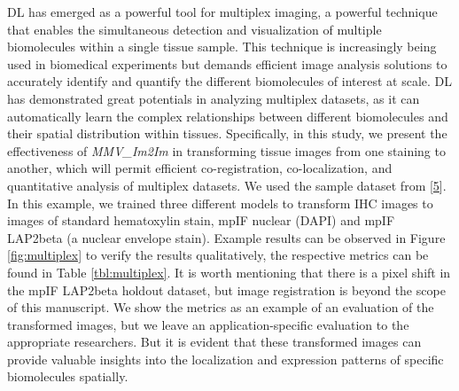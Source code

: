 DL has emerged as a powerful tool for multiplex imaging, a powerful technique that enables the simultaneous detection and visualization of multiple biomolecules within a single tissue sample. This technique is increasingly being used in biomedical experiments but demands efficient image analysis solutions to accurately identify and quantify the different biomolecules of interest at scale. DL has demonstrated great potentials in analyzing multiplex datasets, as it can automatically learn the complex relationships between different biomolecules and their spatial distribution within tissues. Specifically, in this study, we present the effectiveness of \emph{MMV\_Im2Im} in transforming tissue images from one staining to another, which will permit efficient co-registration, co-localization, and quantitative analysis of multiplex datasets. We used the sample dataset from {[}\protect\hyperlink{ref-WwenuBHa}{5}{]}. In this example, we trained three different models to transform IHC images to images of standard hematoxylin stain, mpIF nuclear (DAPI) and mpIF LAP2beta (a nuclear envelope stain). Example results can be observed in Figure \ref{fig:multiplex} to verify the results qualitatively, the respective metrics can be found in Table \ref{tbl:multiplex}. It is worth mentioning that there is a pixel shift in the mpIF LAP2beta holdout dataset, but image registration is beyond the scope of this manuscript. We show the metrics as an example of an evaluation of the transformed images, but we leave an application-specific evaluation to the appropriate researchers. But it is evident that these transformed images can provide valuable insights into the localization and expression patterns of specific biomolecules spatially.

